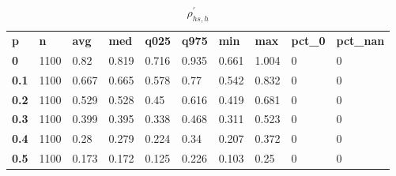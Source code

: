 \begin{table}[h]
 \centering 
\footnotesize
\caption{$\rho_{hs,h}^\prime $}
\label{tab:alphahsh}
\begin{tabular}[h]{| l l l l l l l l l l|
    } \hline
\textbf{ p} & \textbf{ n} & \textbf{ avg} & \textbf{ med} & \textbf{ q025} & \textbf{ q975} & \textbf{ min} & \textbf{ max} & \textbf{ pct\_0} & \textbf{ pct\_nan}
           \\
  \textbf{  0} & 1100 &  0.82 & 0.819 & 0.716 & 0.935 & 0.661 & 1.004 & 0 & 0
           \\
  \textbf{0.1} & 1100 & 0.667 & 0.665 & 0.578 &  0.77 & 0.542 & 0.832 & 0 & 0
           \\
  \textbf{0.2} & 1100 & 0.529 & 0.528 &  0.45 & 0.616 & 0.419 & 0.681 & 0 & 0
           \\
  \textbf{0.3} & 1100 & 0.399 & 0.395 & 0.338 & 0.468 & 0.311 & 0.523 & 0 & 0
           \\
  \textbf{0.4} & 1100 &  0.28 & 0.279 & 0.224 &  0.34 & 0.207 & 0.372 & 0 & 0
           \\
  \textbf{0.5} & 1100 & 0.173 & 0.172 & 0.125 & 0.226 & 0.103 &  0.25 & 0 & 0
           \\
 \hline \end{tabular}
 \end{table}
